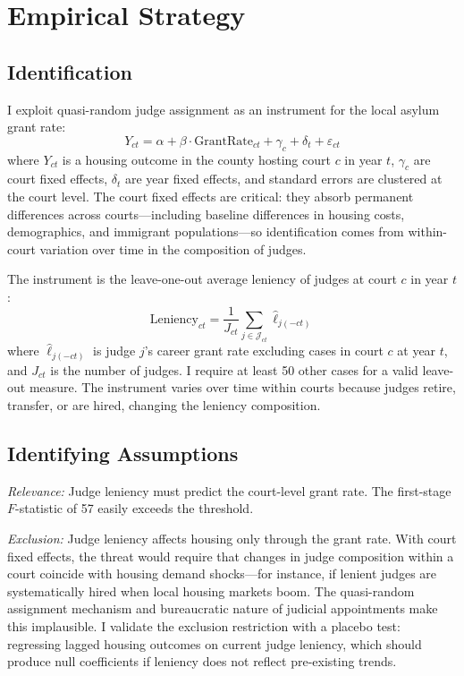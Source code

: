 \documentclass[12pt]{article}
\begin{document}



\section{Empirical Strategy}

\subsection{Identification}

I exploit quasi-random judge assignment as an instrument for the local asylum grant rate:
\begin{equation}
Y_{ct} = \alpha + \beta \cdot \text{GrantRate}_{ct} + \gamma_c + \delta_t + \varepsilon_{ct}
\label{eq:second}
\end{equation}
where $Y_{ct}$ is a housing outcome in the county hosting court $c$ in year $t$, $\gamma_c$ are court fixed effects, $\delta_t$ are year fixed effects, and standard errors are clustered at the court level. The court fixed effects are critical: they absorb permanent differences across courts---including baseline differences in housing costs, demographics, and immigrant populations---so identification comes from within-court variation over time in the composition of judges.

The instrument is the leave-one-out average leniency of judges at court $c$ in year $t$:
\begin{equation}
\text{Leniency}_{ct} = \frac{1}{J_{ct}} \sum_{j \in \mathcal{J}_{ct}} \hat{\ell}_{j(-ct)}
\label{eq:first}
\end{equation}
where $\hat{\ell}_{j(-ct)}$ is judge $j$'s career grant rate excluding cases in court $c$ at year $t$, and $J_{ct}$ is the number of judges. I require at least 50 other cases for a valid leave-out measure. The instrument varies over time within courts because judges retire, transfer, or are hired, changing the leniency composition.

\subsection{Identifying Assumptions}

\textit{Relevance:} Judge leniency must predict the court-level grant rate. The first-stage $F$-statistic of 57 easily exceeds the \citet{stock2005} threshold.

\textit{Exclusion:} Judge leniency affects housing only through the grant rate. With court fixed effects, the threat would require that changes in judge composition within a court coincide with housing demand shocks---for instance, if lenient judges are systematically hired when local housing markets boom. The quasi-random assignment mechanism and bureaucratic nature of judicial appointments make this implausible. I validate the exclusion restriction with a placebo test: regressing lagged housing outcomes on current judge leniency, which should produce null coefficients if leniency does not reflect pre-existing trends.
\end{document}
